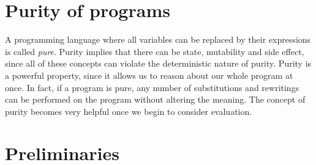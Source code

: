 
\section{Purity of programs}
A programming language where all variables can be replaced by their expressions is called \textit{pure}.
Purity implies that there can be state, mutability and side effect, since all of these concepts can violate the deterministic nature of purity.
Purity is a powerful property, since it allows us to reason about our whole program at once. 
In fact, if a program is pure, any number of substitutions and rewritings can be performed on the program without altering the meaning.
The concept of purity becomes very helpful once we begin to consider evaluation.

\section{Preliminaries}




